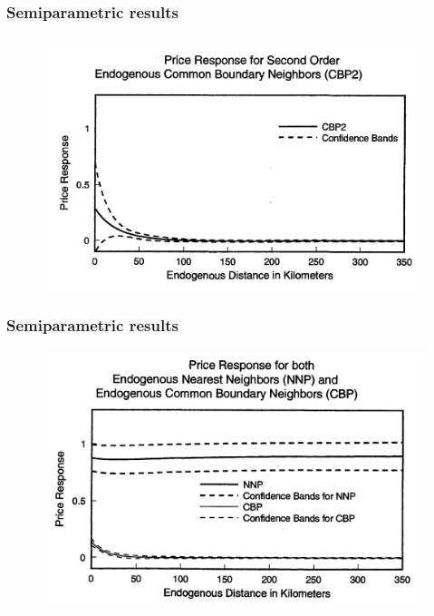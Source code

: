 \documentclass{beamer}
\begin{document}
\begin{frame}
  \frametitle{Semiparametric results}
  \vspace{-0.6cm}
  \begin{figure}
    \includegraphics[width=\linewidth]{CBP2.png}
  \end{figure}
\end{frame}

\begin{frame}
  \frametitle{Semiparametric results}
  \vspace{-0.6cm}
  \begin{figure}
    \includegraphics[width=\linewidth]{NNP&CBP.png}
  \end{figure}
\end{frame}
\end{document}
